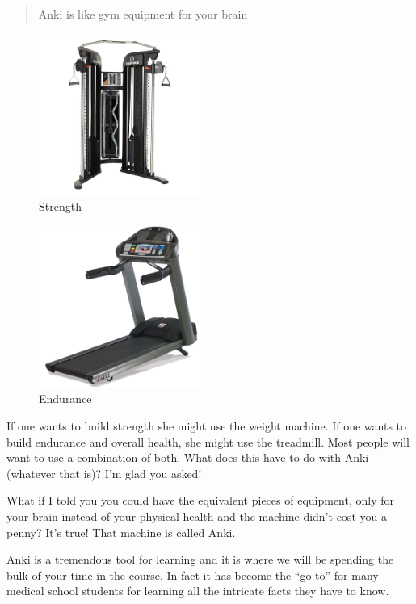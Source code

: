 \documentclass[
]{turabian-researchpaper}
\begin{document}
\begin{quote}
Anki is like gym equipment for your brain
\end{quote}

\begin{figure}

{\centering \includegraphics[width=150pt]{images/weight} 

}

\caption{Strength}\label{fig:unnamed-chunk-39}
\end{figure}

\begin{figure}

{\centering \includegraphics[width=150pt]{images/treadmill} 

}

\caption{Endurance}\label{fig:unnamed-chunk-40}
\end{figure}

If one wants to build strength she might use the weight machine. If one wants to build endurance and overall health, she might use the treadmill. Most people will want to use a combination of both. What does this have to do with Anki (whatever that is)? I'm glad you asked!

What if I told you you could have the equivalent pieces of equipment, only for your brain instead of your physical health and the machine didn't cost you a penny? It's true! That machine is called Anki.

Anki is a tremendous tool for learning and it is where we will be spending the bulk of your time in the course. In fact it has become the ``go to'' for many medical school students for learning all the intricate facts they have to know.
\end{document}
